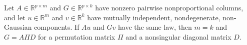 Let \(A\in\mathbb R^{p\times m}\) and \(G\in\mathbb R^{p\times k}\) have nonzero pairwise nonproportional columns, and let \(u\in\mathbb R^m\) and \(v\in\mathbb R^k\) have mutually independent, nondegenerate, non-Gaussian components. If \(Au\) and \(Gv\) have the same law, then \(m=k\) and \(G=A\Pi D\) for a permutation matrix \(\Pi\) and a nonsingular diagonal matrix \(D\).
